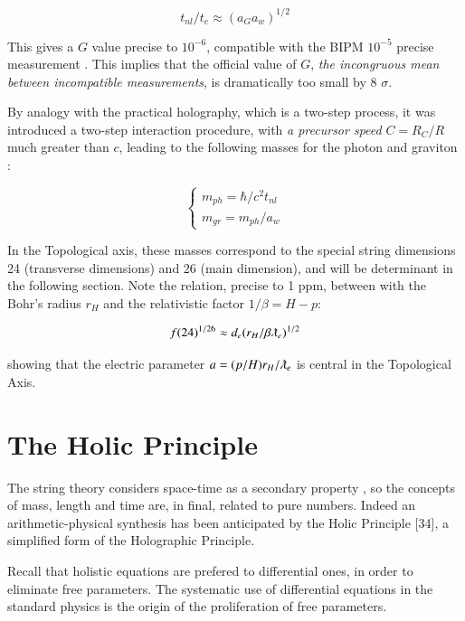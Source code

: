 \documentclass[a4paper,9pt]{article}
\begin{document}
\begin{equation}\label{Eq8}
t_{nl} /t_e   \approx  (a_G a_w)^{1/2}
\end{equation}


This gives a $G$ value precise to $10^{-6}$, compatible with the BIPM $10^{-5}$ precise measurement \cite {Quinn}. This implies that the official value of $G$, \textit{the incongruous mean between incompatible measurements}, is dramatically too small by 8 $\sigma$.


By analogy with the practical holography, which is a two-step process, it was introduced a two-step interaction procedure, with \textit{a precursor speed} $C = R_C/R$ much greater than $c$, leading to the following masses for the photon and graviton \cite{Sanchez3}:

\begin{equation}\label{Eq9}
 \left\{
    \begin{array}{ll}
        m_{ph} = \hbar/c^2t_{nl}\\
        m_{gr} =m_{ph}/a_w
    \end{array}
\right.
\end{equation}

In the Topological axis, these masses correspond to the special string dimensions 24 (transverse dimensions) and 26 (main dimension), and will be determinant in the following section. Note the relation, precise to 1 ppm, between with the Bohr's radius $r_H$  and the relativistic factor $1/\beta = H-p$:

\begin{equation}\label{Eq10}
f(24)^{1/26} \approx d_e (r_H/\beta\lambdabar_e)^{1/2}
\end{equation}

showing that the electric parameter $a = (p/H)r_H/\lambdabar_e$ is central in the Topological Axis.

%
\section{The Holic Principle}

The string theory considers space-time as a secondary property \cite{Seiberg}, so the concepts of mass, length and time are, in final, related to pure numbers. Indeed an arithmetic-physical synthesis has been anticipated by the Holic Principle [34], a simplified form of the Holographic Principle. 

Recall that holistic equations are prefered to differential ones, in order to eliminate free parameters. 
The systematic use of differential equations in the standard physics is the origin of the proliferation of free parameters. 
\end{document}
